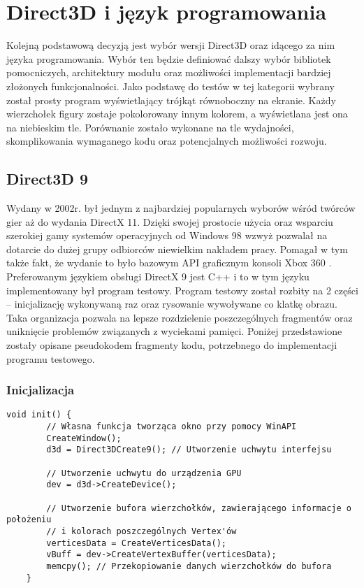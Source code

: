 \section{Direct3D i język programowania}

Kolejną podstawową decyzją jest wybór wersji Direct3D oraz idącego za
nim języka programowania. Wybór ten będzie definiować dalszy wybór
bibliotek pomocniczych, architektury modułu oraz możliwości
implementacji bardziej złożonych funkcjonalności. Jako podstawę do testów w tej kategorii wybrany został prosty program
wyświetlający trójkąt równoboczny na ekranie. Każdy wierzchołek figury
zostaje pokolorowany innym kolorem, a wyświetlana jest ona na niebieskim
tle. Porównanie zostało wykonane na tle wydajności, skomplikowania
wymaganego kodu oraz potencjalnych możliwości rozwoju.

\subsection{Direct3D 9}

Wydany w 2002r. był jednym z najbardziej popularnych wyborów wśród
twórców gier aż do wydania DirectX 11. Dzięki swojej prostocie użycia
oraz wsparciu szerokiej gamy systemów operacyjnych od Windows 98 wzwyż
\cite{falconfly:dxredist:2024} pozwalał na dotarcie do dużej grupy odbiorców niewielkim
nakładem pracy. Pomagał w tym także fakt, że wydanie to było bazowym API
graficznym konsoli Xbox 360 \cite{ms:xbox360bp:2024}. Preferowanym językiem obsługi DirectX 9 jest C++ i to w tym języku
implementowany był program testowy. Program testowy został rozbity na 2 części -- inicjalizację wykonywaną
raz oraz rysowanie wywoływane co klatkę obrazu. Taka organizacja pozwala
na lepsze rozdzielenie poszczególnych fragmentów oraz uniknięcie
problemów związanych z wyciekami pamięci. Poniżej przedstawione zostały
opisane pseudokodem fragmenty kodu, potrzebnego do implementacji
programu testowego.

\subsubsection{Inicjalizacja}
\begin{lstlisting}[caption={Pseudokod inicjalizacji Direct3D 9 (oryginalna treść)}, label={lst:d3d9_init}]
	void init() {
		// Własna funkcja tworząca okno przy pomocy WinAPI
		CreateWindow();
		d3d = Direct3DCreate9(); // Utworzenie uchwytu interfejsu
		
		// Utworzenie uchwytu do urządzenia GPU
		dev = d3d->CreateDevice();
		
		// Utworzenie bufora wierzchołków, zawierającego informacje o położeniu 
		// i kolorach poszczególnych Vertex'ów
		verticesData = CreateVerticesData();
		vBuff = dev->CreateVertexBuffer(verticesData);
		memcpy(); // Przekopiowanie danych wierzchołków do bufora
	}
\end{lstlisting}

